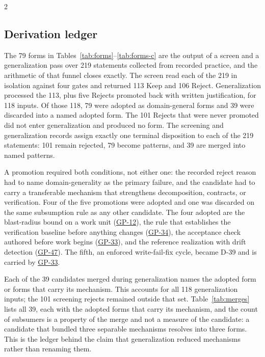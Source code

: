 \begin{multicols}{2}
\subsection{Derivation ledger}

The 79 forms in Tables~\ref{tab:forms}--\ref{tab:forms-c} are the output of a screen and a generalization pass over 219 statements collected from recorded practice, and the arithmetic of that funnel closes exactly. The screen read each of the 219 in isolation against four gates and returned 113 Keep and 106 Reject. Generalization processed the 113, plus five Rejects promoted back with written justification, for 118 inputs. Of those 118, 79 were adopted as domain-general forms and 39 were discarded into a named adopted form. The 101 Rejects that were never promoted did not enter generalization and produced no form. The screening and generalization records assign exactly one terminal disposition to each of the 219 statements: 101 remain rejected, 79 become patterns, and 39 are merged into named patterns.

A promotion required both conditions, not either one: the recorded reject reason had to name domain-generality as the primary failure, and the candidate had to carry a transferable mechanism that strengthens decomposition, contracts, or verification. Four of the five promotions were adopted and one was discarded on the same subsumption rule as any other candidate. The four adopted are the blast-radius bound on a work unit (\hyperlink{gp-12}{GP-12}), the rule that establishes the verification baseline before anything changes (\hyperlink{gp-34}{GP-34}), the acceptance check authored before work begins (\hyperlink{gp-33}{GP-33}), and the reference realization with drift detection (\hyperlink{gp-47}{GP-47}). The fifth, an enforced write-fail-fix cycle, became D-39 and is carried by \hyperlink{gp-33}{GP-33}.

Each of the 39 candidates merged during generalization names the adopted form or forms that carry its mechanism. This accounts for all 118 generalization inputs; the 101 screening rejects remained outside that set. Table~\ref{tab:merges} lists all 39, each with the adopted forms that carry its mechanism, and the count of subsumers is a property of the merge and not a measure of the candidate: a candidate that bundled three separable mechanisms resolves into three forms. This is the ledger behind the claim that generalization reduced mechanisms rather than renaming them.
\end{multicols}

